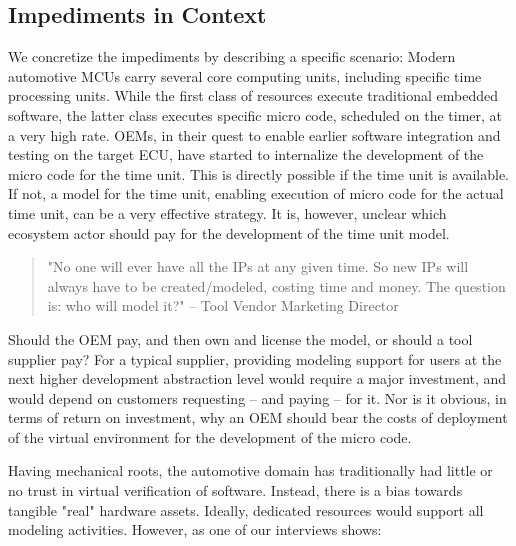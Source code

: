 \subsection{Impediments in Context}
We concretize the impediments 
by describing a specific scenario:
Modern automotive MCUs carry several core computing units, including specific time processing units.
While the first class of resources execute traditional embedded software, the latter class executes specific micro code, scheduled on the timer, at a very high rate.
OEMs, in their quest to enable earlier software integration and testing on the target ECU, have started to internalize the development of the micro code for the time unit.
This is directly possible if the time unit is available.
If not, a model for the time unit, enabling execution of micro code for the actual time unit, can be a very effective strategy.
It is, however, unclear which ecosystem actor should pay for the development of the time unit model.

\begin{quote}
"No one will ever have all the IPs at any given time. So new IPs will always have to be created/modeled, costing time and money. The question is: who will model it?"
-- Tool Vendor Marketing Director
\end{quote}

Should the OEM pay, and then own and license the model, or should a tool supplier pay?
For a typical supplier, providing modeling support for users at the next higher development abstraction level would require a major investment, and would depend on customers requesting -- and paying -- for it.
Nor is it obvious, in terms of return on investment, why an OEM should bear the costs of deployment of the virtual environment for the development of the micro code.


Having mechanical roots, the automotive domain has traditionally had little or no trust in virtual verification of software.
Instead, there is a bias towards tangible "real" hardware assets.
Ideally, dedicated resources would support all modeling activities.
However, as one of our interviews shows:

